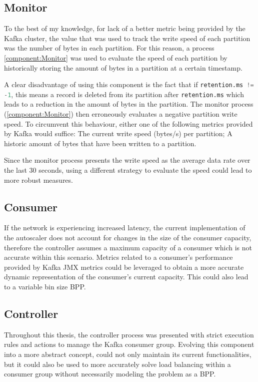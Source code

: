\subsection{Monitor}

To the best of my knowledge, for lack of a better metric being provided by the Kafka cluster, the value that was used to track the write speed of each partition was the number of bytes in each partition. For this reason, a process \ref{component:Monitor} was used to evaluate the speed of each partition by historically storing the amount of bytes in a partition at a certain timestamp.

A clear disadvantage of using this component is the fact that if \lstinline[language=Python]{retention.ms != -1}, this means a record is deleted from its partition after \lstinline[language=Python]{retention.ms} which leads to a reduction in the amount of bytes in the partition. The monitor process (\ref{component:Monitor}) then erroneously evaluates a negative partition write speed. To circumvent this behaviour, either one of the following metrics provided by Kafka would suffice: The current write speed (bytes/s) per partition; A historic amount of bytes that have been written to a partition.

Since the monitor process presents the write speed as the average data rate over the last 30 seconds, using a different strategy to evaluate the speed could lead to more robust measures.

\subsection{Consumer}

If the network is experiencing increased latency, the current implementation of the autoscaler does not account for changes in the size of the consumer capacity, therefore the controller assumes a maximum capacity of a consumer which is not accurate within this scenario. Metrics related to a consumer's performance provided by Kafka JMX metrics could be leveraged to obtain a more accurate dynamic representation of the consumer's current capacity. This could also lead to a variable bin size BPP.

\subsection{Controller}

Throughout this thesis, the controller process was presented with strict execution rules and actions to manage the Kafka consumer group. Evolving this component into a more abstract concept, could not only maintain its current functionalities, but it could also be used to more accurately solve load balancing within a consumer group without necessarily modeling the problem as a BPP. 

